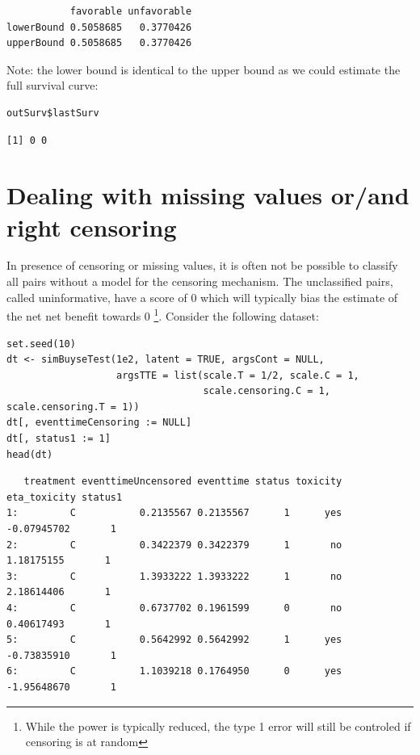 \documentclass[12pt]{article}
\begin{document}
\begin{verbatim}
           favorable unfavorable
lowerBound 0.5058685   0.3770426
upperBound 0.5058685   0.3770426
\end{verbatim}


Note: the lower bound is identical to the upper bound as we could
estimate the full survival curve:
\lstset{language=r,label= ,caption= ,captionpos=b,numbers=none}
\begin{lstlisting}
outSurv$lastSurv
\end{lstlisting}

\begin{verbatim}
[1] 0 0
\end{verbatim}


\clearpage

\section{Dealing with missing values or/and right censoring}
\label{sec:orge6db869}

In presence of censoring or missing values, it is often not be
 possible to classify all pairs without a model for the censoring
 mechanism. The unclassified pairs, called uninformative, have a score
 of 0 which will typically bias the estimate of the net net benefit
 towards 0 \footnote{While the power is typically reduced, the type 1 error
 will still be controled if censoring is at random}. Consider the
 following dataset:
\lstset{language=r,label= ,caption= ,captionpos=b,numbers=none}
\begin{lstlisting}
set.seed(10)
dt <- simBuyseTest(1e2, latent = TRUE, argsCont = NULL,
                   argsTTE = list(scale.T = 1/2, scale.C = 1,
                                  scale.censoring.C = 1, scale.censoring.T = 1))
dt[, eventtimeCensoring := NULL]
dt[, status1 := 1]
head(dt)
\end{lstlisting}

\begin{verbatim}
   treatment eventtimeUncensored eventtime status toxicity eta_toxicity status1
1:         C           0.2135567 0.2135567      1      yes  -0.07945702       1
2:         C           0.3422379 0.3422379      1       no   1.18175155       1
3:         C           1.3933222 1.3933222      1       no   2.18614406       1
4:         C           0.6737702 0.1961599      0       no   0.40617493       1
5:         C           0.5642992 0.5642992      1      yes  -0.73835910       1
6:         C           1.1039218 0.1764950      0      yes  -1.95648670       1
\end{verbatim}
\end{document}

